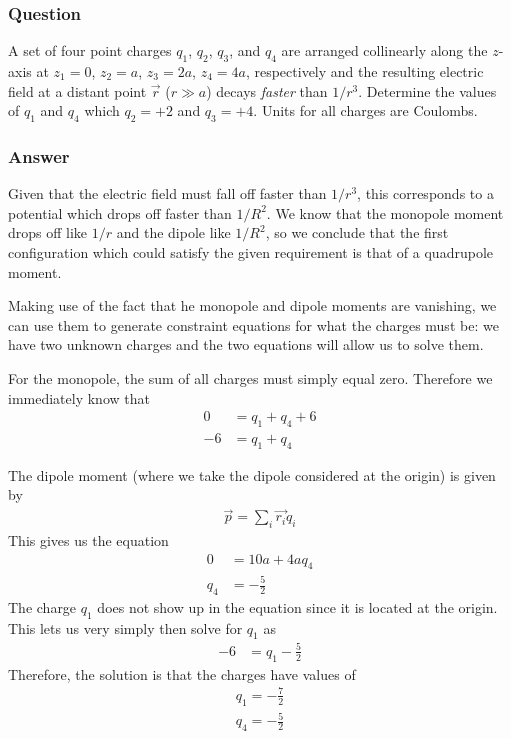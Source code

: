 \subsubsection{Question}

A set of four point charges $q_1$, $q_2$, $q_3$, and $q_4$ are arranged
collinearly along the $z$-axis at $z_1 = 0$, $z_2 = a$, $z_3 = 2a$, $z_4 = 4a$,
respectively and the resulting electric field at a distant point $\vec r$ ($r
\gg a$) decays \emph{faster} than $1/r^3 $. Determine the values of $q_1$ and $q_4$
which $q_2 = +2$ and $q_3 = +4$. Units for all charges are Coulombs.

\subsubsection{Answer}

Given that the electric field must fall off faster than $1/r^3 $, this
corresponds to a potential which drops off faster than $1/R^2$. We know that
the monopole moment drops off like $1/r$ and the dipole like $1/R^2$, so we
conclude that the first configuration which could satisfy the given
requirement is that of a quadrupole moment.

Making use of the fact that he monopole and dipole moments are vanishing, we
can use them to generate constraint equations for what the charges must be:
we have two unknown charges and the two equations will allow us to solve them.

For the monopole, the sum of all charges must simply equal zero. Therefore
we immediately know that
\begin{align*}
    0 &= q_1 + q_4 + 6 \\
    -6 &= q_1 + q_4
\end{align*}

The dipole moment (where we take the dipole considered at the origin) is given
by
\begin{align*}
    \vec p = \sum_i \vec{r_i} q_i
\end{align*}
This gives us the equation
\begin{align*}
    0 &= 10a + 4aq_4 \\
    q_4 &= -\frac{5}{2}
\end{align*}
The charge $q_1$ does not show up in the equation since it is located at the
origin. This lets us very simply then solve for $q_1$ as
\begin{align*}
    -6 &= q_1 - \frac{5}{2}
\end{align*}
Therefore, the solution is that the charges have values of
\begin{align}
    \boxed{ q_1 = -\frac{7}{2} } \\
    \boxed{ q_4 = -\frac{5}{2} }
\end{align}

